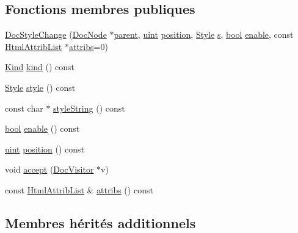 \subsection*{Fonctions membres publiques}
\begin{DoxyCompactItemize}
\item 
\hyperlink{class_doc_style_change_a2b3b84ba022c755b0cb9be7da8383bb4}{Doc\+Style\+Change} (\hyperlink{class_doc_node}{Doc\+Node} $\ast$\hyperlink{class_doc_node_a990d8b983962776a647e6231d38bd329}{parent}, \hyperlink{qglobal_8h_a4d3943ddea65db7163a58e6c7e8df95a}{uint} \hyperlink{class_doc_style_change_a96e1f5cb02a503743ef8b20c3fe5c5f3}{position}, \hyperlink{class_doc_style_change_a97757d2d85c39228c90693491a56d277}{Style} \hyperlink{060__command__switch_8tcl_a011c73f2dbb87635a3b4206c72355f6e}{s}, \hyperlink{qglobal_8h_a1062901a7428fdd9c7f180f5e01ea056}{bool} \hyperlink{class_doc_style_change_a6ad04006c94fa5f2f94244212adde656}{enable}, const \hyperlink{class_html_attrib_list}{Html\+Attrib\+List} $\ast$\hyperlink{class_doc_style_change_a92d16705d230a9fd9cd97f390d21b635}{attribs}=0)
\item 
\hyperlink{class_doc_node_aebd16e89ca590d84cbd40543ea5faadb}{Kind} \hyperlink{class_doc_style_change_a78293478748976cb16d98778a5ec2f90}{kind} () const 
\item 
\hyperlink{class_doc_style_change_a97757d2d85c39228c90693491a56d277}{Style} \hyperlink{class_doc_style_change_a33766042efb4442f3185015bd363a7fc}{style} () const 
\item 
const char $\ast$ \hyperlink{class_doc_style_change_aa8c7b984eff761d5e3abcf42bdad49be}{style\+String} () const 
\item 
\hyperlink{qglobal_8h_a1062901a7428fdd9c7f180f5e01ea056}{bool} \hyperlink{class_doc_style_change_a6ad04006c94fa5f2f94244212adde656}{enable} () const 
\item 
\hyperlink{qglobal_8h_a4d3943ddea65db7163a58e6c7e8df95a}{uint} \hyperlink{class_doc_style_change_a96e1f5cb02a503743ef8b20c3fe5c5f3}{position} () const 
\item 
void \hyperlink{class_doc_style_change_aa6c460a097e12a52603f4560daf1125f}{accept} (\hyperlink{class_doc_visitor}{Doc\+Visitor} $\ast$v)
\item 
const \hyperlink{class_html_attrib_list}{Html\+Attrib\+List} \& \hyperlink{class_doc_style_change_a92d16705d230a9fd9cd97f390d21b635}{attribs} () const 
\end{DoxyCompactItemize}
\subsection*{Membres hérités additionnels}


